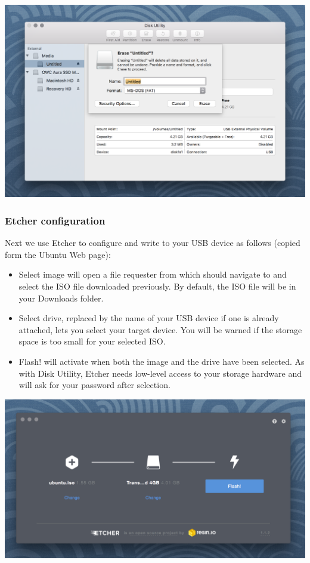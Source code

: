 \includegraphics[width=0.8\columnwidth]{images/14c3877ad1c43497.png}

\subsubsection{Etcher configuration}

Next we use Etcher to configure and write to your USB device as follows
(copied form the Ubuntu Web page):

\begin{itemize}
\item
  Select image will open a file requester from which should navigate to
  and select the ISO file downloaded previously. By default, the ISO
  file will be in your Downloads folder.
\item
  Select drive, replaced by the name of your USB device if one is
  already attached, lets you select your target device. You will be
  warned if the storage space is too small for your selected ISO.
\item
  Flash! will activate when both the image and the drive have been
  selected. As with Disk Utility, Etcher needs low-level access to your
  storage hardware and will ask for your password after selection.
\end{itemize}

\includegraphics[width=0.8\columnwidth]{images/3bb88ce0bc88abb3.png}

